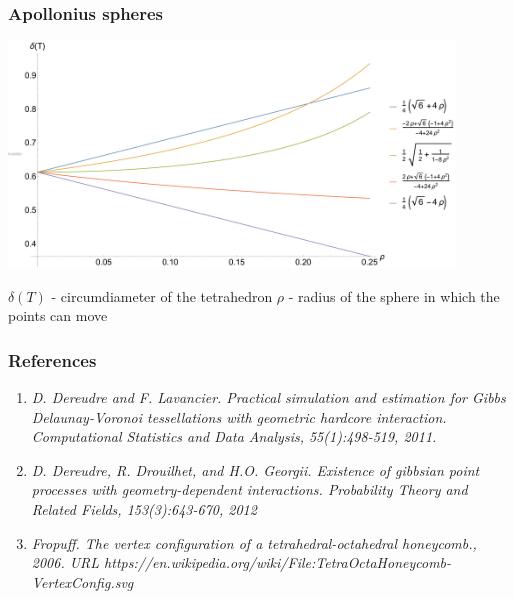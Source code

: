 \documentclass[c, 10pt]{beamer}
\begin{document}
\begin{frame}\frametitle{Apollonius spheres}



\begin{center}
	\includegraphics[height = 6cm]{./FigureLayout/t1.pdf}
\end{center}

$\delta(T)$ - circumdiameter of the tetrahedron \newline
$\rho$ - radius of the sphere in which the points can move








\end{frame}






\begin{frame}[noframenumbering]\frametitle{References}
	
	\begin{enumerate}
		\item \textit{D. Dereudre and F. Lavancier. Practical simulation and estimation for
Gibbs Delaunay-Voronoi tessellations with geometric hardcore interaction.
Computational Statistics and Data Analysis, 55(1):498-519, 2011.}

\item \textit{D. Dereudre, R. Drouilhet, and H.O. Georgii. Existence of gibbsian point
processes with geometry-dependent interactions. Probability Theory and
Related Fields, 153(3):643-670, 2012}


\item \textit{Fropuff. The vertex configuration of a tetrahedral-octahedral honeycomb., 2006.
	URL https://en.wikipedia.org/wiki/File:TetraOctaHoneycomb-VertexConfig.svg}
\end{enumerate}

\end{frame}



\end{document}
